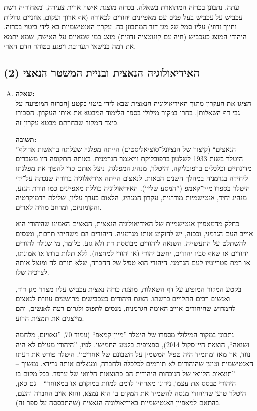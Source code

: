 \documentclass[a4paper]{article}
\newcommand\hl[1]   {#1}
\begin{document}
	עתה, נתבונן בכרזה המתוארת בשאלה. בכרזה מוצגת אישה ארית צעירה, ומאחוריה רשת עכביש על עכביש בעל פנים עם מאפיינים יהודים לכאורה (אף ארוך ועקום, אוזניים גדולות וחיוך זדוני) עליו סמל של מגן דוד המתבונן בה. עקרון האנטישמיות בא לידי ביטוי בכרזה. היהודי המוצג כעכביש (חיה עם קונוטציה זדונית) מוצג כמי שמאיים על האישה, שמא יתמא את דמה בנישאי תערובת ויפגע בטוהר הדם הארי. 
	
	\subsection{האידיאולוגיה הנאצית ובניית המשטר הנאצי (2)}
		\begin{enumerate}[A.]
			\item \textbf{שאלה: }\\
			\textbf{הציגו} את העקרון מתוך האידיאולוגיה הנאצית שבא לידי ביטוי בקטע [הכרזה המופיעה על גבי דף השאלות]. בחרו במקור מילולי בספר הלימוד המבטא את אותו העקרון. הסבירו כיצד המקור שבחרתם מבטא עקרון זה. 
			
			\textbf{תשובה: }\\
			''\hl{הנאצים}`` (קיצור של הנציונל־סוציאליסטים) הייתה מפלגה שעלתה בראשות \hl{אדולף היטלר} בשנת 1933 לשלטון ברפובליקת וויאנמר הגרמנית. באותה התקופה היו משברים מדינתיים וכלכלים ברפובליקה, והיטלר, מנהיג המפלגה, ניצל אותם כדי להפוך את מפלגתו ליחידה בגרמניה במהלך השנים הבאות. לנאצים הייתה אידיאלוגיה ברורה שנכתה על־ידי היטלר בספרו מיין־קאמפ (''המסע שלי``). האידיאולוגיה כוללת מאפיינים כמו תורת הגזע, מנהיג יחיד, אנטישמיות מודרנית, עקרון המנהיג, הלאום כערך עליון, שלילת הדמוקרטיה והקומוניזם, ומרחב מחיה לארים. 
			
			כחלק מהמאפיין \hl{אנטישמיות} של האידיאולוגיה הנאצית, הנאצים האמינו שהיהודי הוא אוייב העם הגרמני, וככזה, יש להוקיע אותו מגרמניה. היהודים הם משחיתי תרבות, ומנסים להשתלט על התעשייה. השנאה ליהודים מבוססת דת ולא גזע, כלומר, מי שנולד להורים יהודים או שאף סביו יהודים, יחשב יהודי (או יהודי למחצה), ללא תלות בדתו או אמונתו, או רמת פטריוטיו לעם הגרמני. היהודי הוא טפיל של החברה, שלא תורם לה ומנצל אותה לצרכיה שלו. 
			
			בקטע המקור המופיע על דף השאלות, מוצגת כרזה נאצית עכביש עליו מצויר מגן דוד, ואנשים רבים התלויים ברשתו. הצגת היהודים כעכבישים מרושעים עוזרת לנאצים להמחיש שהיהודים אוייב האומה הגרמנית, מנסים לתפוס ולגרום רעה לאנשים, והם מייצגים את תמצית הרוע. 
			
			נתבונן במקור המילולי מספרו של היטלר ''מיין־קמאפ`` (עמוד 70, ''נאציזם, מלחמה ושואה``, הוצאת היי־סקול 2014), ספציפית בקטע החמישי. לפיו, ''היהודי מעולם לא היה נווד, אך מאז ומתמיד היה טפיל המשמין על חשבונם של אחרים``. היטלר פורש את דעתו האנטישמית וטוען שהיהודים לא תורמים לכלכלה ולחברה, ומנצלים אותה גרידא. נמשיך – ''תוצאות הלוואי של הנוכחות היהודית הם כתוצאות הלוואי של ערפד. בכל מקום בו היהודי מבסס את עצמו, נידונו מארחיו לדמם למוות במוקדם או במאוחר`` – גם כאן, היטלר טוען שהיהודי מנסה להשמיד את המקום בו הוא נמצא, והוא אויב החברה והעם, בהתאם למאפיין האנטישמיות באידיאולוגיה הנאצית (שהתבססה על ספר זה). 
			

\end{enumerate}
\end{document}

